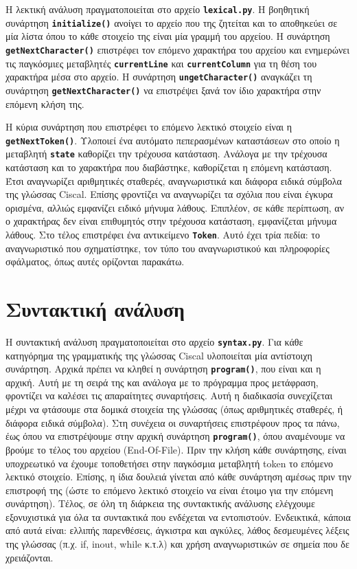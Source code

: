\documentclass[a4paper]{article}
\let\OldTexttt\texttt
\renewcommand{\texttt}[1]{\OldTexttt{\textbf{#1}}}
\begin{document}
Η λεκτική ανάλυση πραγματοποιείται στο αρχείο \texttt{lexical.py}. Η βοηθητική
συνάρτηση \texttt{initialize()} ανοίγει το αρχείο που της ζητείται και το αποθηκεύει
σε μία λίστα όπου το κάθε στοιχείο της είναι μία γραμμή του αρχείου. Η συνάρτηση
\texttt{getNextCharacter()} επιστρέφει τον επόμενο χαρακτήρα του αρχείου και
ενημερώνει τις παγκόσμιες μεταβλητές \texttt{currentLine} και
\texttt{currentColumn} για τη θέση του χαρακτήρα μέσα στο αρχείο. Η συνάρτηση
\texttt{ungetCharacter()} αναγκάζει τη συνάρτηση \texttt{getNextCharacter()} να
επιστρέψει ξανά τον ίδιο χαρακτήρα στην επόμενη κλήση της.

Η κύρια συνάρτηση που επιστρέφει το επόμενο λεκτικό στοιχείο είναι η
\texttt{getNextToken()}. Υλοποιεί ένα αυτόματο πεπερασμένων καταστάσεων στο οποίο η
μεταβλητή \texttt{state} καθορίζει την τρέχουσα κατάσταση. Ανάλογα με την τρέχουσα
κατάσταση και το χαρακτήρα που διαβάστηκε, καθορίζεται η επόμενη κατάσταση. Έτσι
αναγνωρίζει αριθμητικές σταθερές, αναγνωριστικά και διάφορα ειδικά σύμβολα της
γλώσσας Ciscal. Επίσης φροντίζει να αναγνωρίζει τα σχόλια που είναι έγκυρα
ορισμένα, αλλιώς εμφανίζει ειδικό μήνυμα λάθους. Επιπλέον, σε κάθε περίπτωση, αν ο
χαρακτήρας δεν είναι επιθυμητός στην τρέχουσα κατάσταση, εμφανίζεται μήνυμα λάθους.
Στο τέλος επιστρέφει ένα αντικείμενο \texttt{Token}. Αυτό έχει τρία πεδία: το
αναγνωριστικό που σχηματίστηκε, τον τύπο του αναγνωριστικού και πληροφορίες
σφάλματος, όπως αυτές ορίζονται παρακάτω.

\newpage
\section{Συντακτική ανάλυση}
Η συντακτική ανάλυση πραγματοποιείται στο αρχείο \texttt{syntax.py}. Για κάθε
κατηγόρημα της γραμματικής της γλώσσας Ciscal υλοποιείται μία αντίστοιχη συνάρτηση.
Αρχικά πρέπει να κληθεί η συνάρτηση \texttt{program()}, που είναι και η αρχική.
Αυτή με τη σειρά της και ανάλογα με το πρόγραμμα προς μετάφραση, φροντίζει να
καλέσει τις απαραίτητες συναρτήσεις. Αυτή η διαδικασία συνεχίζεται μέχρι να
φτάσουμε στα δομικά στοιχεία της γλώσσας (όπως αριθμητικές σταθερές, ή διάφορα
ειδικά σύμβολα). Στη συνέχεια οι συναρτήσεις επιστρέφουν προς τα πάνω, έως όπου να
επιστρέψουμε στην αρχική συνάρτηση \texttt{program()}, όπου αναμένουμε να βρούμε το
τέλος του αρχείου (End-Of-File). Πριν την κλήση κάθε συνάρτησης, είναι υποχρεωτικό να
έχουμε τοποθετήσει στην παγκόσμια μεταβλητή token το επόμενο λεκτικό στοιχείο.
Επίσης, η ίδια δουλειά γίνεται από κάθε συνάρτηση αμέσως πριν την επιστροφή της
(ώστε το επόμενο λεκτικό στοιχείο να είναι έτοιμο για την επόμενη συνάρτηση).
Τέλος, σε όλη τη διάρκεια της συντακτικής ανάλυσης ελέγχουμε εξονυχιστικά για όλα
τα συντακτικά που ενδέχεται να εντοπιστούν. Ενδεικτικά, κάποια από αυτά είναι:
ελλιπής παρενθέσεις, άγκιστρα και αγκύλες, λάθος δεσμευμένες λέξεις της γλώσσας
(π.χ. if, inout, while κ.τ.λ) και χρήση αναγνωριστικών σε σημεία που δε
χρειάζονται.
\end{document}
